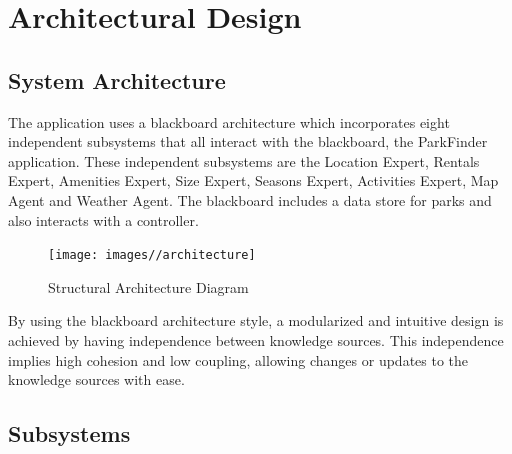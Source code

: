 \documentclass[titlepage,12pt]{article}
\begin{document}
\section{Architectural Design}
\label{sec:architectural_design}


\subsection{System Architecture}
\label{sub:system_architecture}

The application uses a blackboard architecture which incorporates eight independent subsystems that all interact with the blackboard, the ParkFinder application. These independent subsystems are the Location Expert, Rentals Expert, Amenities Expert, Size Expert, Seasons Expert, Activities Expert, Map Agent and Weather Agent. The blackboard includes a data store for parks and also interacts with a controller.\newline 

\begin{figure}[H]
	\centerline{\texttt{[image: images//architecture]}}
	\caption{Structural Architecture Diagram}
	\label{useCaseDiagram}
\end{figure} 

By using the blackboard architecture style, a modularized and intuitive design is achieved by having independence between knowledge sources. This independence implies high cohesion and low coupling, allowing changes or updates to the knowledge sources with ease. 



\subsection{Subsystems}
\label{sub:subsystems}
\end{document}
